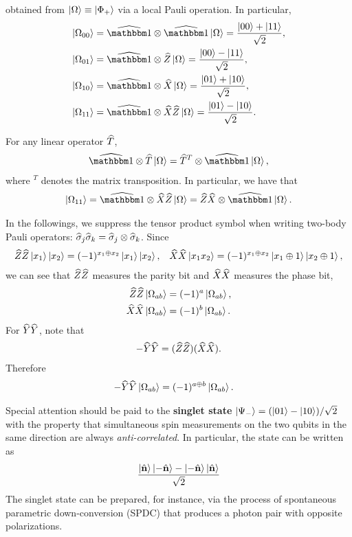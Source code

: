 \noindent obtained from  $\ket{\Omega}\equiv \ket{\Phi_+}$ via a local Pauli operation. In particular,
\begin{align}
	\ket{\Omega_{00}} &= \op\id\otimes\op\id\ket{\Omega} = \frac{\ket{00}+\ket{11}}{\sqrt{2}}, \\
	\ket{\Omega_{01}} &= \op\id\otimes\op Z\ket{\Omega}= \frac{\ket{00}-\ket{11}}{\sqrt{2}}, \\
	\ket{\Omega_{10}} &= \op\id\otimes\op X\ket{\Omega}= \frac{\ket{01}+\ket{10}}{\sqrt{2}}, \\
	\ket{\Omega_{11}} &= \op\id\otimes\op X \op Z\ket{\Omega}= \frac{\ket{01}-\ket{10}}{\sqrt{2}}.
\end{align}

\begin{lemma}\label{}
	For any linear operator $\widehat{T}$,
	\begin{align}
		\op\id\otimes \op T\ket{\Omega} = \op T^T \otimes \op\id \ket{\Omega},
	\end{align}
	where $^T$ denotes the matrix transposition. In particular, we have that
	\begin{align}
		\ket{\Omega_{11}} = \op\id\otimes \op X\op Z\ket{\Omega} = \op Z\op X \otimes \op\id \ket{\Omega}.
	\end{align}
\end{lemma}


In the followings, we suppress the tensor product symbol when writing two-body Pauli operators: $\widehat{\sigma}_j \widehat{\sigma}_k = \widehat{\sigma}_j \otimes \widehat{\sigma}_k$.
Since
\begin{align}
	\widehat{Z}\widehat{Z}\ket{x_1}\ket{x_2}=(-1)^{x_1\oplus x_2}\ket{x_1}\ket{x_2}, && 
	\widehat{X}\widehat{X}\ket{x_1x_2}=(-1)^{x_1\oplus x_2}\ket{x_1\oplus 1}\ket{x_2\oplus 1},
\end{align}
we can see that $\widehat{Z} \widehat{Z}$ measures the parity bit and $\widehat{X} \widehat{X}$ measures the phase bit,
\begin{align}
	\widehat{Z}\widehat{Z} \ket{\Omega_{ab}} &= (-1)^a \ket{\Omega_{ab}}, \\
	\widehat{X}\widehat{X} \ket{\Omega_{ab}} &= (-1)^b \ket{\Omega_{ab}}.
\end{align}
For $\widehat{Y} \widehat{Y}$, note that
\begin{align}
	-\widehat{Y} \widehat{Y} =  (\widehat{Z} \widehat{Z})(\widehat{X} \widehat{X}).
\end{align}
Therefore
\begin{align}
		-\widehat{Y}\widehat{Y} \ket{\Omega_{ab}} &= (-1)^{a\oplus b} \ket{\Omega_{ab}}.
\end{align}

Special attention should be paid to the {\bf singlet state} $\ket{\Psi_-} = (\ket{01}-\ket{10})/\sqrt{2}$ with the property that simultaneous spin measurements on the two qubits in the same direction are always \emph{anti-correlated}. In particular, the state can be written as
\begin{align}
	\frac{\ket{\hat{\vb n}}\ket{-\hat{\vb n}} - \ket{-\hat{\vb n}}\ket{\hat{\vb n}}}{\sqrt 2}
\end{align}
The singlet state can be prepared, for instance, via the process of spontaneous parametric down-conversion (SPDC) that produces a photon pair with opposite polarizations.



